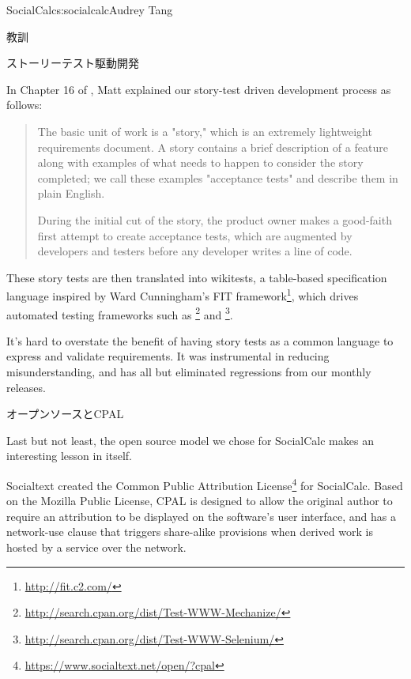 \begin{aosachapter}{SocialCalc}{s:socialcalc}{Audrey Tang}
\begin{aosasect1}{教訓}
\begin{aosasect2}{ストーリーテスト駆動開発}

In Chapter 16 of \cite{bib:goucher:test}, Matt explained our
story-test driven development process as follows:

\begin{quotation}

  The basic unit of work is a "story," which is an extremely
  lightweight requirements document. A story contains a brief
  description of a feature along with examples of what needs to happen
  to consider the story completed; we call these examples "acceptance
  tests" and describe them in plain English.

  During the initial cut of the story, the product owner makes a
  good-faith first attempt to create acceptance tests, which are
  augmented by developers and testers before any developer writes
  a line of code.

\end{quotation}

These story tests are then translated into wikitests, a table-based
specification language inspired by Ward Cunningham's FIT
framework\footnote{\url{http://fit.c2.com/}}, which drives automated
testing frameworks such as
\footnote{\url{http://search.cpan.org/dist/Test-WWW-Mechanize/}}
and
\footnote{\url{http://search.cpan.org/dist/Test-WWW-Selenium/}}.

It's hard to overstate the benefit of having story tests as a common
language to express and validate requirements. It was instrumental in
reducing misunderstanding, and has all but eliminated regressions from
our monthly releases.

\end{aosasect2}


\begin{aosasect2}{オープンソースとCPAL}

Last but not least, the open source model we chose for SocialCalc
makes an interesting lesson in itself.


Socialtext created the Common Public Attribution
License\footnote{\url{https://www.socialtext.net/open/?cpal}} for
SocialCalc.  Based on the Mozilla Public License, CPAL is designed to
allow the original author to require an attribution to be displayed
on the software's user interface, and has a network-use clause that
triggers share-alike provisions when derived work is hosted by a
service over the network.


\end{aosasect2}
\end{aosasect1}
\end{aosachapter}
